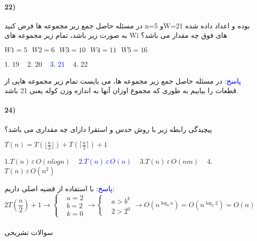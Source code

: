 \documentclass[10pt,a4paper]{article}
\begin{document}
	\paragraph{22)} در مسئله حاصل جمع زیر مجموعه ها فرض کنید n=5 وW=21 بوده و اعداد داده شده به صورت زیر باشد، تمام زیر مجموعه های Wi های فوق چه مقدار می باشد؟
	\begin{flushleft}
		$W1=5 \,\,\,\, W2=6 \,\,\,\, W3=10 \,\,\,\, W4= 11 \,\,\,\, W5=16$
	\end{flushleft}
	\begin{flushright} 
		1.\,\,19\,\,\,\,\, 2.\,\,20\,\,\,\,\, \textcolor{blue}{3.\,\,21}\,\,\,\,\, 4.\,\,22
	\end{flushright}
	\begin{flushright} 
		\textcolor{blue}{پاسخ:}
	در مسئله حاصل جمع زیر مجموعه ها، می بایست تمام زیر مجموعه هایی از قطعات را بیابیم به طوری که مجموع اوزان آنها به اندازه وزن کوله یعنی 21 باشد.
	\end{flushright}

	\paragraph{24)} پیچیدگی رابطه زیر با روش حدس و استقرا دارای چه مقداری می باشد؟
	\begin{flushleft}
		$T(n)=T(\lfloor\frac{n}{2}\rfloor)+T(\lceil\frac{n}{2}\rceil)+1$
	\end{flushleft}
	\begin{flushright} 
		1.$T(n)\,\varepsilon\,O(nlogn)$\,\,\,\,\, \textcolor{blue}{2.$T(n)\,\varepsilon\,O(n)$}\,\,\,\,\, 3.$T(n)\,\varepsilon\,O(nm)$\,\,\,\,\, 4.$T(n)\,\varepsilon\,O(n^2)$
	\end{flushright}
	\begin{flushright} 
		\textcolor{blue}{پاسخ:}
	با استفاده از قضیه اصلی داریم:
	$$
		2T(\frac{n}{2})+1 \to \begin{cases} &a=2 \\ &b=2 \\ &k=0 \end{cases} \to \begin{cases} & a>b^k \\ & 2>2^0 \end{cases} \to O(n^{\log_b a}) = O(n^{\log_2 2}) = O(n)
		$$
	\end{flushright}

	\paragraph{}
	سوالات تشریحی
\end{document}
